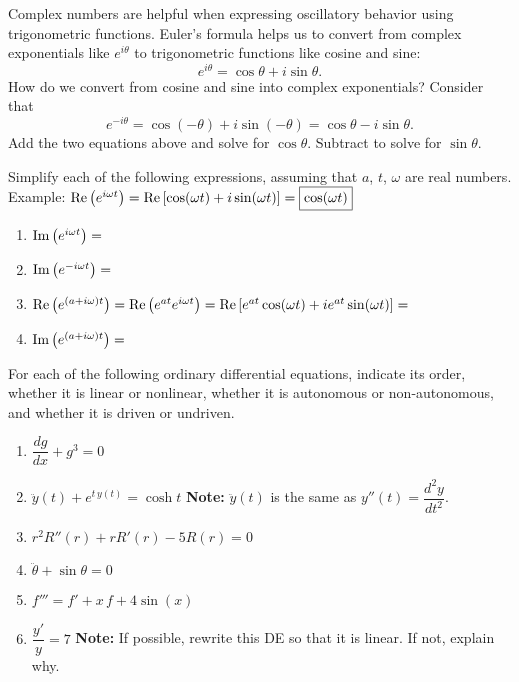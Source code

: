 \documentclass[12pt,letterpaper]{hmcpset}
\renewcommand{\Re}{\mathop{\rm {Re}}}
\renewcommand{\Im}{\mathop{\rm {Im}}}
\begin{document}

\begin{problem}[1]
Complex numbers are helpful when expressing oscillatory behavior using trigonometric functions. Euler's formula helps us to convert from complex exponentials like $e^{i\theta}$ to trigonometric functions like cosine and sine:
\[
e^{i\theta}=\cos\theta + i \sin\theta.
\]
How do we convert from cosine and sine into complex exponentials? Consider that
\[
e^{-i\theta}=\cos(-\theta)+i\sin(-\theta) = \cos\theta-i\sin\theta.
\]
Add the two equations above and solve for $\cos\theta$. Subtract to solve for $\sin\theta$.
\end{problem}

\begin{solution}
\vfill
\end{solution}
\newpage

\begin{problem}[2]
  Simplify each of the following expressions, assuming that $a$, $t$, $\omega$ are real numbers.\\

Example: $\Re\left(e^{i\omega t}\right)=\Re\left[\cos(\omega t)+i\sin(\omega t)\right]=\fbox{$\cos(\omega t)$}$

\begin{enumerate}
\item $\Im\left(e^{i\omega t}\right)=$
\item $\Im\left(e^{-i\omega t}\right)=$
\item $\Re\left(e^{(a+i\omega)t}\right)=\Re\left(e^{at}e^{i\omega t}\right)=\Re\left[e^{at}\cos(\omega t)+i e^{a t}\sin(\omega t)\right]=$
\item $\Im\left(e^{(a+i\omega)t}\right)=$
\end{enumerate}
\end{problem}

\begin{solution}
\vfill
\end{solution}
\newpage

\begin{problem}[3]
  For each of the following ordinary differential equations,
  indicate its order, whether it is linear or nonlinear, whether
  it is autonomous or non-autonomous, and whether it is driven or undriven.
\begin{enumerate}
\item $\dfrac{dg}{dx}+ g^3=0$
\item $\ddot{y}(t)+e^{t\,y(t)}=\cosh t$
\qquad \textbf{Note:} $\ddot{y}(t)$ is the same as $y''(t)=\dfrac{d^2y}{dt^2}$.
\item $r^2R''(r)+r R'(r)-5 R(r)=0$
\item $\ddot{\theta}+\sin\theta=0$
\item $f''' = f' + x\,f + 4\sin(x)$
\item $\dfrac{y'}{y} = 7$
\qquad \textbf{Note:} If possible, rewrite this DE so that it is linear.  If not, explain why.
\end{enumerate}
\end{problem}
\end{document}
